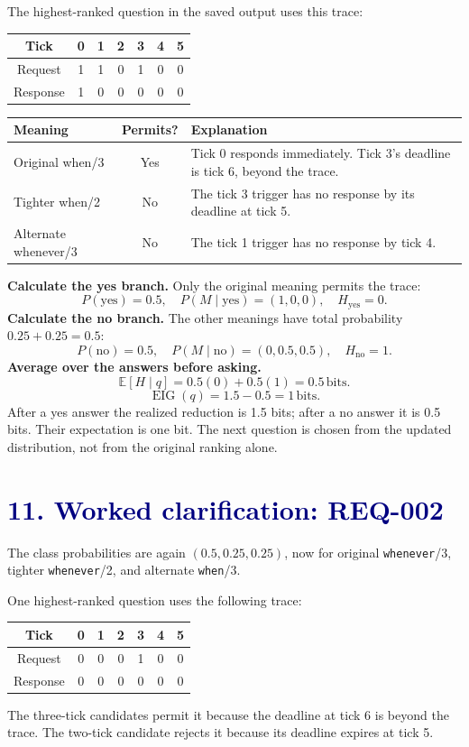 \documentclass[11pt,a4paper]{article}
\newcommand{\lesson}[2]{\section*{\textcolor{navy}{#1. #2}}}
\newcommand{\bits}{\,\mathrm{bits}}
\begin{document}
The highest-ranked question in the saved output uses this trace:
\begin{center}
\begin{tabular}{c|cccccc}
\toprule
Tick & 0 & 1 & 2 & 3 & 4 & 5\\\midrule
Request & 1 & 1 & 0 & 1 & 0 & 0\\
Response & 1 & 0 & 0 & 0 & 0 & 0\\\bottomrule
\end{tabular}
\end{center}

\begin{tabular}{p{37mm}cp{93mm}}
\toprule
Meaning & Permits? & Explanation\\\midrule
Original when/3 & Yes & Tick 0 responds immediately. Tick 3's deadline is tick 6, beyond the trace.\\[3pt]
Tighter when/2 & No & The tick 3 trigger has no response by its deadline at tick 5.\\[3pt]
Alternate whenever/3 & No & The tick 1 trigger has no response by tick 4.\\\bottomrule
\end{tabular}

\textbf{Calculate the yes branch.}
Only the original meaning permits the trace:
\[
P(\mathrm{yes})=0.5,\quad
P(M\mid\mathrm{yes})=(1,0,0),\quad H_{\mathrm{yes}}=0.
\]
\textbf{Calculate the no branch.}
The other meanings have total probability \(0.25+0.25=0.5\):
\[
P(\mathrm{no})=0.5,\quad
P(M\mid\mathrm{no})=(0,0.5,0.5),\quad H_{\mathrm{no}}=1.
\]
\textbf{Average over the answers before asking.}
\[
\mathbb{E}[H\mid q]=0.5(0)+0.5(1)=0.5\bits.
\]
\[
\boxed{\operatorname{EIG}(q)=1.5-0.5=1\bits.}
\]
After a yes answer the realized reduction is 1.5 bits; after a no answer it is 0.5 bits. Their expectation is one bit. The next question is chosen from the updated distribution, not from the original ranking alone.
\newpage

\lesson{11}{Worked clarification: REQ-002}
The class probabilities are again \((0.5,0.25,0.25)\), now for original \texttt{whenever}/3, tighter \texttt{whenever}/2, and alternate \texttt{when}/3.

One highest-ranked question uses the following trace:
\begin{center}
\begin{tabular}{c|cccccc}
\toprule
Tick & 0 & 1 & 2 & 3 & 4 & 5\\\midrule
Request & 0 & 0 & 0 & 1 & 0 & 0\\
Response & 0 & 0 & 0 & 0 & 0 & 0\\\bottomrule
\end{tabular}
\end{center}
The three-tick candidates permit it because the deadline at tick 6 is beyond the trace. The two-tick candidate rejects it because its deadline expires at tick 5.
\end{document}
